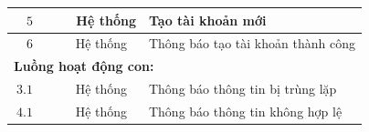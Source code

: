 \documentclass[12pt]{book}
\begin{document}
\begin{table}[ht]
\begin{tabularx}{\textwidth}{lXX}
      \hline
      $\quad 5\qquad\quad$ Hệ thống & \multicolumn{2}{l}{Tạo tài khoản mới} \\
      \hline
      $\quad 6\qquad\quad$ Hệ thống & \multicolumn{2}{l}{Thông báo tạo tài khoản thành công} \\
      \hline
      \multicolumn{3}{l}{\textbf{Luồng hoạt động con:}} \\
      \hline
      $\ 3.1\qquad\quad$ Hệ thống & \multicolumn{2}{l}{Thông báo thông tin bị trùng lặp} \\
      \hline
      $\ 4.1\qquad\quad$ Hệ thống & \multicolumn{2}{l}{Thông báo thông tin không hợp lệ} \\
      \bottomrule
    \end{tabularx}
  \end{table}
  \FloatBarrier
\end{document}
